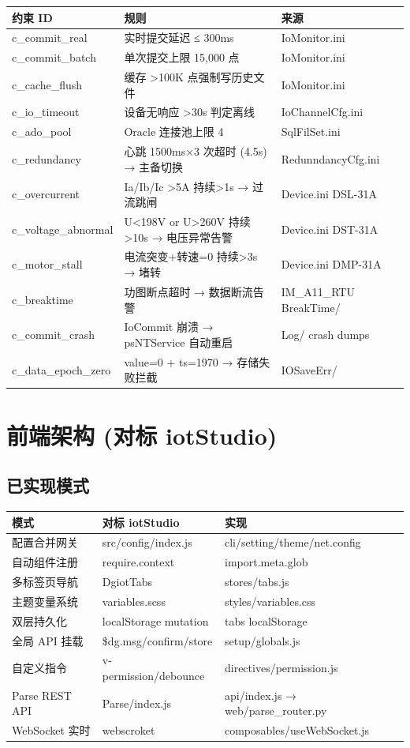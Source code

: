 \documentclass[12pt,a4paper]{ctexart}
\begin{document}
\begin{longtable}{p{3cm}p{4cm}p{5cm}}
\toprule
\textbf{约束 ID} & \textbf{规则} & \textbf{来源} \\
\midrule
c\_commit\_real & 实时提交延迟 ≤ 300ms & IoMonitor.ini \\
c\_commit\_batch & 单次提交上限 15,000 点 & IoMonitor.ini \\
c\_cache\_flush & 缓存 >100K 点强制写历史文件 & IoMonitor.ini \\
c\_io\_timeout & 设备无响应 >30s 判定离线 & IoChannelCfg.ini \\
c\_ado\_pool & Oracle 连接池上限 4 & SqlFilSet.ini \\
c\_redundancy & 心跳 1500ms×3 次超时 (4.5s) → 主备切换 & RedunndancyCfg.ini \\
c\_overcurrent & Ia/Ib/Ic >5A 持续>1s → 过流跳闸 & Device.ini DSL-31A \\
c\_voltage\_abnormal & U<198V or U>260V 持续>10s → 电压异常告警 & Device.ini DST-31A \\
c\_motor\_stall & 电流突变+转速=0 持续>3s → 堵转 & Device.ini DMP-31A \\
c\_breaktime & 功图断点超时 → 数据断流告警 & IM\_A11\_RTU BreakTime/ \\
c\_commit\_crash & IoCommit 崩溃 → psNTService 自动重启 & Log/ crash dumps \\
c\_data\_epoch\_zero & value=0 + ts=1970 → 存储失败拦截 & IOSaveErr/ \\
\bottomrule
\end{longtable}

\section{前端架构 (对标 iotStudio)}

\subsection{已实现模式}

\begin{longtable}{p{4cm}p{4cm}p{5cm}}
\toprule
\textbf{模式} & \textbf{对标 iotStudio} & \textbf{实现} \\
\midrule
配置合并网关 & src/config/index.js & cli/setting/theme/net.config \\
自动组件注册 & require.context & import.meta.glob \\
多标签页导航 & DgiotTabs & stores/tabs.js \\
主题变量系统 & variables.scss & styles/variables.css \\
双层持久化 & localStorage mutation & tabs localStorage \\
全局 API 挂载 & \$dg.msg/confirm/store & setup/globals.js \\
自定义指令 & v-permission/debounce & directives/permission.js \\
Parse REST API & Parse/index.js & api/index.js → web/parse\_router.py \\
WebSocket 实时 & webscroket & composables/useWebSocket.js \\
\bottomrule
\end{longtable}
\end{document}
